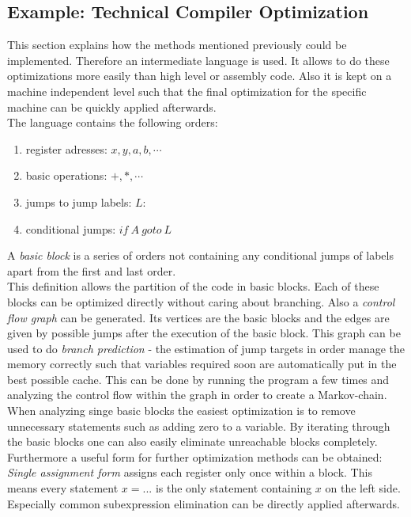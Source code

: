 \documentclass[12pt, a4paper]{article}
\begin{document}
\subsection{Example: Technical Compiler Optimization}
This section explains how the methods mentioned previously could be implemented. Therefore an intermediate language is used. It allows to do these optimizations more easily than high level or assembly code. Also it is kept on a machine independent level such that the final optimization for the specific machine can be quickly applied afterwards.\\
The language contains the following orders:
\begin{enumerate}
\item register adresses: $x, y, a, b, \cdots$
\item basic operations: $+, *,\cdots$
\item jumps to jump labels: $L:$
\item conditional jumps: $if\ A\ goto\ L$
\end{enumerate}
A \textit{basic block} is a series of orders not containing any conditional jumps of labels apart from the first and last order. \\
This definition allows the partition of the code in basic blocks. Each of these blocks can be optimized directly without caring about branching. Also a \textit{control flow graph} can be generated. Its vertices are the basic blocks and the edges are given by possible jumps after the execution of the basic block. This graph can be used to do \textit{branch prediction} - the estimation of jump targets in order manage the memory correctly such that variables required soon are automatically put in the best possible cache. This can be done by running the program a few times and analyzing the control flow within the graph in order to create a Markov-chain. \\
When analyzing singe basic blocks the easiest optimization is to remove unnecessary statements such as adding zero to a variable. By iterating through the basic blocks one can also easily eliminate unreachable blocks completely. Furthermore a useful form for further optimization methods can be obtained: \textit{Single assignment form} assigns each register only once within a block. This means every statement $x = ...$ is the only statement containing $x$ on the left side. Especially common subexpression elimination can be directly applied afterwards.
\end{document}
